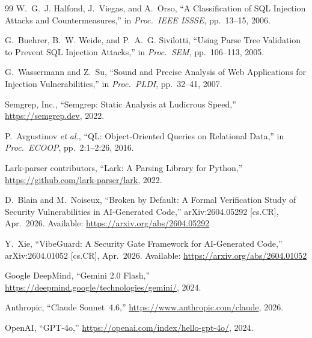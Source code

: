 \documentclass[conference,compsoc]{IEEEtran}
\begin{document}
\begin{thebibliography}{99}
W.~G.~J. Halfond, J.~Viegas, and A.~Orso,
``{A Classification of SQL Injection Attacks and Countermeasures},''
in \textit{Proc.\ IEEE ISSSE}, pp.~13--15, 2006.

G.~Buehrer, B.~W. Weide, and P.~A.~G. Sivilotti,
``{Using Parse Tree Validation to Prevent SQL Injection Attacks},''
in \textit{Proc.\ SEM}, pp.~106--113, 2005.

G.~Wassermann and Z.~Su,
``{Sound and Precise Analysis of Web Applications for Injection
Vulnerabilities},''
in \textit{Proc.\ PLDI}, pp.~32--41, 2007.

{Semgrep, Inc.},
``{Semgrep: Static Analysis at Ludicrous Speed},''
\url{https://semgrep.dev}, 2022.

P.~Avgustinov \textit{et al.},
``{QL: Object-Oriented Queries on Relational Data},''
in \textit{Proc.\ ECOOP}, pp.~2:1--2:26, 2016.

{Lark-parser contributors},
``{Lark: A Parsing Library for Python},''
\url{https://github.com/lark-parser/lark}, 2022.

D.~Blain and M.~Noiseux,
``{Broken by Default: A Formal Verification Study of Security
Vulnerabilities in AI-Generated Code},''
arXiv:2604.05292 [cs.CR], Apr.\ 2026.
Available: \url{https://arxiv.org/abs/2604.05292}

Y.~Xie,
``{VibeGuard: A Security Gate Framework for AI-Generated Code},''
arXiv:2604.01052 [cs.CR], Apr.\ 2026.
Available: \url{https://arxiv.org/abs/2604.01052}

{Google DeepMind},
``{Gemini 2.0 Flash},''
\url{https://deepmind.google/technologies/gemini/}, 2024.

{Anthropic},
``{Claude Sonnet~4.6},''
\url{https://www.anthropic.com/claude}, 2026.

{OpenAI},
``{GPT-4o},''
\url{https://openai.com/index/hello-gpt-4o/}, 2024.

\end{thebibliography}
\end{document}

